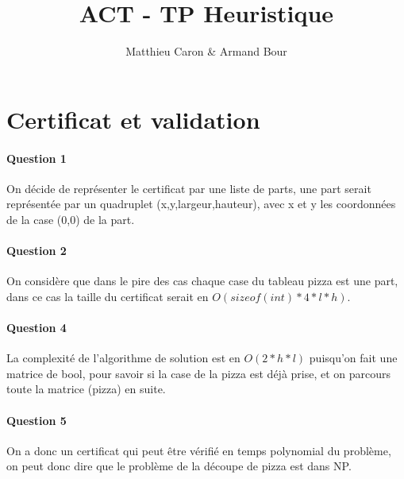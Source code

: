 \documentclass[a4paper,10pt]{report}
\title{ACT - TP Heuristique}
\author{Matthieu Caron & Armand Bour}
\begin{document}
\maketitle

\section{Certificat et validation}

\paragraph{Question 1}
On décide de représenter le certificat par une liste de parts, une part serait représentée par 
un quadruplet (x,y,largeur,hauteur), avec x et y les coordonnées de la case (0,0) de la part.

\paragraph{Question 2}
On considère que dans le pire des cas chaque case du tableau pizza est une part, dans ce cas la taille du certificat
serait en $O(sizeof(int)*4*l*h)$.

\paragraph{Question 4}
La complexité de l'algorithme de solution est en $O(2*h*l)$ puisqu'on fait une matrice de bool, pour savoir si la case de la pizza est déjà prise,
et on parcours toute la matrice (pizza) en suite.

\paragraph{Question 5}
On a donc un certificat qui peut être vérifié en temps polynomial du problème, on peut donc dire que le problème de la découpe de pizza est dans NP.

\begin{abstract}
\end{abstract}
\end{document}
